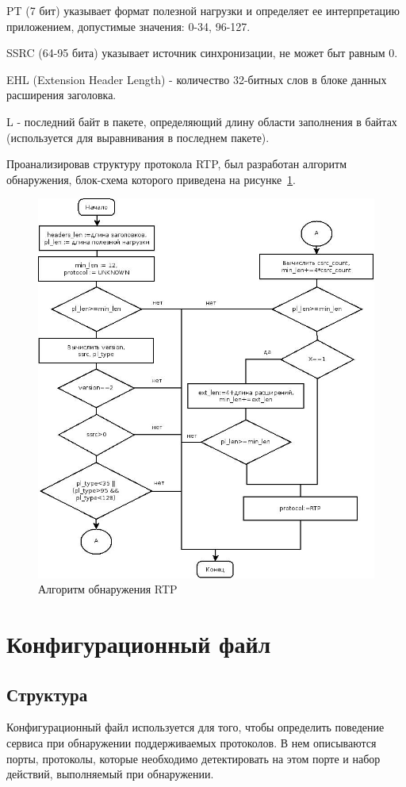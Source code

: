 PT (7 бит) указывает формат полезной нагрузки и определяет ее интерпретацию приложением, допустимые значения: 0-34, 96-127.

SSRC (64-95 бита) указывает источник синхронизации, не может быт равным 0.

EHL (Extension Header Length) - количество 32-битных слов в блоке данных расширения заголовка.

L - последний байт в пакете, определяющий длину области заполнения в байтах (используется для выравнивания в последнем пакете).

Проанализировав структуру протокола RTP, был разработан алгоритм обнаружения, блок-схема которого приведена на рисунке~\ref{pic:rtp_alg}.
\begin{figure}
\centering
\includegraphics[scale=0.6]{pictures/rtp_alg}
\caption{Алгоритм обнаружения RTP}
\label{pic:rtp_alg}
\end{figure}


\section{Конфигурационный файл}
\subsection{Структура}
Конфигурационный файл используется для того, чтобы определить поведение сервиса при обнаружении поддерживаемых протоколов. В нем описываются порты, протоколы, которые необходимо детектировать на этом порте и набор действий, выполняемый при обнаружении.

